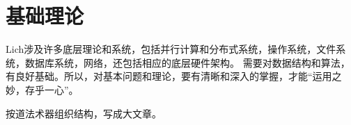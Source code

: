 \chapter{基础理论}

Lich涉及许多底层理论和系统，包括并行计算和分布式系统，操作系统，文件系统，数据库系统，网络，还包括相应的底层硬件架构。
需要对数据结构和算法，有良好基础。所以，对基本问题和理论，要有清晰和深入的掌握，才能“运用之妙，存乎一心”。

按道法术器组织结构，写成大文章。

